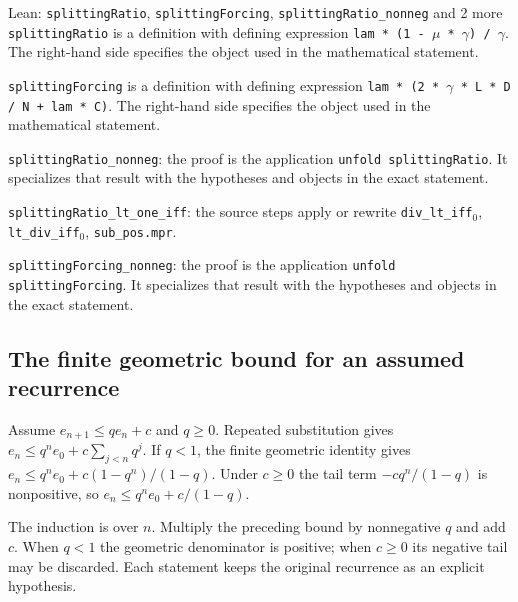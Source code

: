 \documentclass[11pt,a4paper]{report}
\begin{document}
\begin{leanbox}{Lean: \texttt{splittingRatio}, \texttt{splittingForcing}, \texttt{splittingRatio\_\allowbreak{}nonneg} and 2 more}
\texttt{splitting\allowbreak{}Ratio} is a definition with defining expression \texttt{lam * (1 -\allowbreak{} \ensuremath{\mu} * \ensuremath{\gamma}) /\allowbreak{} \ensuremath{\gamma}}. The right-hand side specifies the object used in the mathematical statement.



\texttt{splitting\allowbreak{}Forcing} is a definition with defining expression \texttt{lam * (2 * \ensuremath{\gamma} * L * D /\allowbreak{} N + lam * C)}. The right-hand side specifies the object used in the mathematical statement.



\texttt{splitting\allowbreak{}Ratio\_\allowbreak{}nonneg}: the proof is the application \texttt{unfold splitting\allowbreak{}Ratio}. It specializes that result with the hypotheses and objects in the exact statement.



\texttt{splitting\allowbreak{}Ratio\_\allowbreak{}lt\_\allowbreak{}one\_\allowbreak{}iff}: the source steps apply or rewrite \texttt{div\_\allowbreak{}lt\_\allowbreak{}iff\ensuremath{{}_{0}}}, \texttt{lt\_\allowbreak{}div\_\allowbreak{}iff\ensuremath{{}_{0}}}, \texttt{sub\_\allowbreak{}pos.\allowbreak{}mpr}.



\texttt{splitting\allowbreak{}Forcing\_\allowbreak{}nonneg}: the proof is the application \texttt{unfold splitting\allowbreak{}Forcing}. It specializes that result with the hypotheses and objects in the exact statement.
\end{leanbox}
\subsection{\texorpdfstring{The finite geometric bound for an assumed recurrence}{The finite geometric bound for an assumed recurrence}}
\label{report-step-ProximalLangevin-Recurrence-lean-2}


Assume \(e_{n+1}\le q e_n+c\) and \(q\ge0\). Repeated substitution gives \(e_n\le q^ne_0+c\sum_{j<n}q^j\). If \(q<1\), the finite geometric identity gives \(e_n\le q^ne_0+c(1-q^n)/(1-q)\). Under \(c\ge0\) the tail term \(-cq^n/(1-q)\) is nonpositive, so \(e_n\le q^ne_0+c/(1-q)\).



The induction is over \(n\). Multiply the preceding bound by nonnegative \(q\) and add \(c\). When \(q<1\) the geometric denominator is positive; when \(c\ge0\) its negative tail may be discarded. Each statement keeps the original recurrence as an explicit hypothesis.
\end{document}
